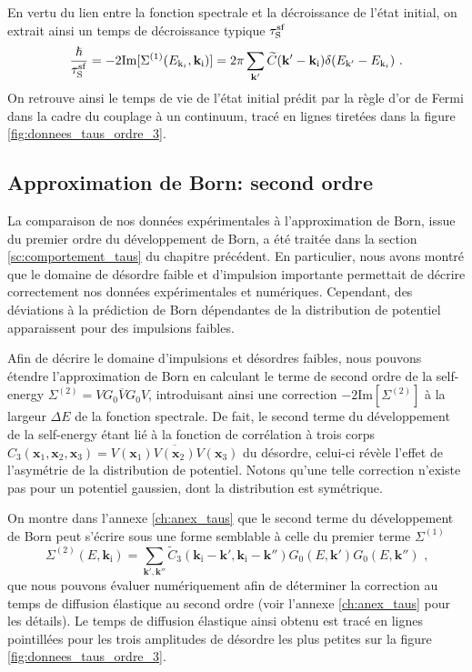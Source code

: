 En vertu du lien entre la fonction spectrale et la décroissance de l'état initial, on extrait ainsi un temps de décroissance typique $\tau_{\mathrm{S}}^{\mathrm{sf}}$ 
\begin{equation}
\frac{\hslash}{\tau_{\mathrm{S}}^{\mathrm{sf}}}=-2 \mathrm{Im}[\Sigma^{(1)}(E_{\mathrm{k}_i},\mathbf{k}_{\mathrm{i}})]=2\pi \sum_{\mathbf{k}'}{\widetilde{C}(\mathbf{k}'-\mathbf{k}_{\mathrm{i}}) \delta(E_{\mathrm{k}'}-E_{\mathrm{k}_i})} \text{ .}
\end{equation}
On retrouve ainsi le temps de vie de l'état initial prédit par la règle d'or de Fermi dans la cadre du couplage à un continuum, tracé en lignes tiretées dans la figure \ref{fig:donnees_taus_ordre_3}. 



\subsection{Approximation de Born: second ordre}
La comparaison de nos données expérimentales à l'approximation de Born, issue du premier ordre du développement de Born, a été traitée dans la section \ref{sc:comportement_taus} du chapitre précédent. En particulier, nous avons montré que le domaine de désordre faible et d'impulsion importante permettait de décrire correctement nos données expérimentales et numériques. Cependant, des déviations à la prédiction de Born dépendantes de la distribution de potentiel apparaissent pour des impulsions faibles. 

Afin de décrire le domaine d'impulsions et désordres faibles, nous pouvons étendre l'approximation de Born en calculant le terme de second ordre de la self-energy $\Sigma^{(2)}= \overline{V G_0 V G_0 V}$, introduisant ainsi une correction $-2 \mathrm{Im}[\Sigma^{(2)}]$ à la largeur $\Delta E$ de la fonction spectrale. De fait, le second terme du développement de la self-energy étant lié à la fonction de corrélation à trois corps $C_{\mathrm{3}}(\mathbf{x}_{\mathrm{1}}, \mathbf{x}_{\mathrm{2}}, \mathbf{x}_{\mathrm{3}})=\overline{V(\mathbf{x}_{\mathrm{1}}) V(\mathbf{x}_{\mathrm{2}}) V(\mathbf{x}_{\mathrm{3}})}$ du désordre, celui-ci révèle l'effet de l'asymétrie de la distribution de potentiel. Notons qu'une telle correction n'existe pas pour un potentiel gaussien, dont la distribution est symétrique. 


On montre dans l'annexe \ref{ch:anex_taus} que le second terme du développement de Born peut s'écrire sous une forme semblable à celle du premier terme $\Sigma^{(1)}$
\begin{equation}
\Sigma^{(2)}(E,\mathbf{k}_{\mathrm{i}})=\sum_{\mathbf{k}',\mathbf{k}''}{\widetilde{C}_{\mathrm{3}}(\mathbf{k}_{\mathrm{i}}-\mathbf{k}',\mathbf{k}_{\mathrm{i}}-\mathbf{k}'') G_0(E,\mathbf{k}') G_0(E,\mathbf{k}'')} \text{ ,}
\end{equation}
que nous pouvons évaluer numériquement afin de déterminer la correction au temps de diffusion élastique au second ordre (voir l'annexe \ref{ch:anex_taus} pour les détails). Le temps de diffusion élastique ainsi obtenu est tracé en lignes pointillées pour les trois amplitudes de désordre les plus petites sur la figure \ref{fig:donnees_taus_ordre_3}.

